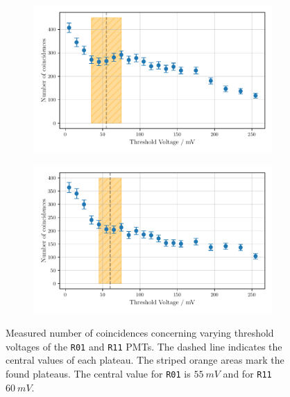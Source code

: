 \begin{figure}
    \begin{subfigure}[b]{0.48\textwidth}
        \includegraphics[width=\textwidth]{plots/threshR01.pdf}
    \end{subfigure}\hfill
    \begin{subfigure}[b]{0.48\textwidth}
        \includegraphics[width=\textwidth]{plots/threshR11.pdf}
    \end{subfigure}
    \caption{Measured number of coincidences concerning varying threshold voltages
    of the \texttt{R01} and \texttt{R11} PMTs.
    The dashed line indicates the central values of each plateau. The striped orange areas mark the found plateaus.
    The central value for \texttt{R01} is $\SI{55}{mV}$ and for \texttt{R11} $\SI{60}{mV}$.}
    \label{fig:appthresh2}
\end{figure}   

